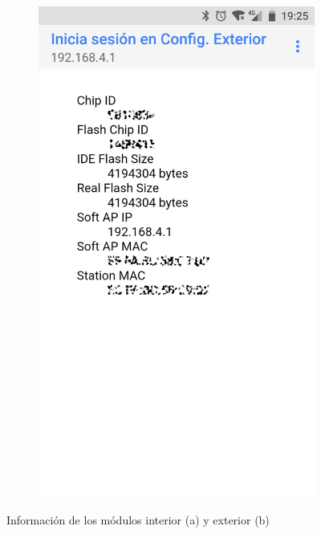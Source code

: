 \begin{figure}
\begin{subfigure}{0.49\columnwidth}
  \includegraphics[width=1\columnwidth,frame]{images/exterior-info}
  \caption{}
  \label{fig:exterior-info}
\end{subfigure}
\caption{Información de los módulos interior (a) y exterior (b)}
\end{figure}

